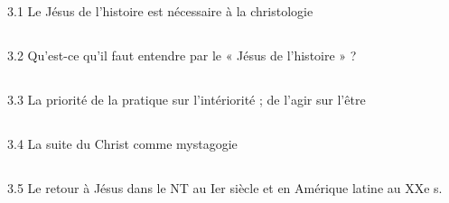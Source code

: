 \subsection{}
3.1 Le Jésus de l’histoire est nécessaire à la christologie

\subsection{}
3.2 Qu’est-ce qu’il faut entendre par le « Jésus de l’histoire » ?

\subsection{}
3.3 La priorité de la pratique sur l’intériorité ; de l’agir sur l’être

\subsection{}
3.4 La suite du Christ comme mystagogie

\subsection{}
3.5 Le retour à Jésus dans le NT au Ier siècle et en Amérique latine au XXe s.
